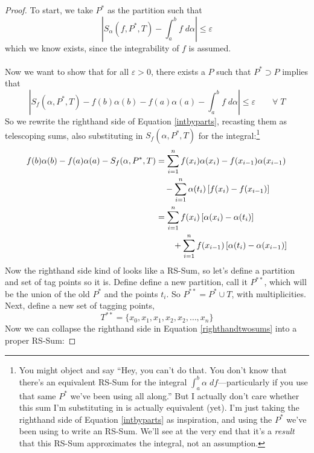 \documentclass[12pt]{article}
\theoremstyle{plain}
\theoremstyle{definition}
\theoremstyle{remark}
\begin{document}
\begin{proof}
To start, we take $P^*$ as the partition such that 
\begin{equation}
    \label{ibpassump}
    \left\lvert S_\alpha(f,P^*,T) - \int^b_a f\;d\alpha 
    \right\rvert \leq \varepsilon 
\end{equation}
which we know exists, since the integrability of $f$ is assumed. 
\\
\\
Now we want to show that for all $\varepsilon>0$, there exists a $P$ such that $P^*\supset P$ implies that 
    \[ \left\lvert S_f(\alpha,P^*,T) -  f(b) \alpha(b) - 
        f(a)\alpha(a) - \int^b_a f \; d\alpha \right\rvert \leq 
        \varepsilon \qquad \forall \; T\]
        So we rewrite the righthand side of Equation \ref{intbyparts}, recasting them as telescoping sums, also substituting in $S_f(\alpha,P^*,T)$ for the integral:\footnote{You might object and say ``Hey, you can't do that.  You don't know that there's an equivalent RS-Sum for the integral $\int^b_a \alpha\;df$---particularly if you use that same $P^*$ we've been using all along.'' But I actually don't care whether this sum I'm substituting in is actually equivalent (yet). I'm just taking the righthand side of Equation \ref{intbyparts} as inspiration, and using the $P^*$ we've been using to write an RS-Sum. We'll see at the very end that it's a \emph{result} that this RS-Sum approximates the integral, not an assumption.}
\begin{align}
    f(b) \alpha(b) - f(a)\alpha(a) - S_f(\alpha,P^*,T)
        &= \sum^n_{i=1} f(x_i) \alpha(x_i) - f(x_{i-1})
        \alpha(x_{i-1}) \notag\\
    &\quad - \sum^n_{i=1} \alpha(t_i) \left[f(x_i) - f(x_{i-1})
        \right] \notag\\
    &= \sum^n_{i=1} f(x_i) \left[\alpha(x_i) - \alpha(t_i) \right]
        \notag\\
    &\qquad +\sum^n_{i=1} f(x_{i-1}) \left[\alpha(t_i) 
    - \alpha(x_{i-1})\right]\label{righthandtwosums}
\end{align}
Now the righthand side kind of looks like a RS-Sum, so let's define a partition and set of tag points so it is. Define define a new partition, call it $P^{**}$, which will be the union of the old $P^*$ and the points $t_i$. So $P^{**} = P^*\cup T$, with multiplicities. Next, define a new set of tagging points,
    \[ T^{**} = \{ x_0, x_1, x_1, x_2, x_2,\ldots, x_n \} \]
Now we can collapse the righthand side in Equation \ref{righthandtwosums} into a proper RS-Sum:

\end{proof}
\end{document}
